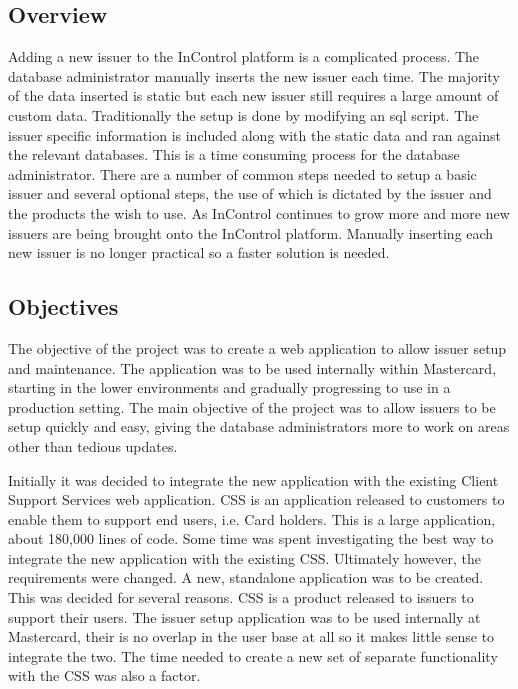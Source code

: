 \documentclass[a4paper, 11pt, titlepage]{article}
\begin{document}
\subsection{Overview}
Adding a new issuer to the InControl platform is a complicated process. The database administrator manually inserts the new issuer each time. The majority of the data inserted is static but each new issuer still requires a large amount of custom data. Traditionally the setup is done by modifying an sql script. The issuer specific information is included along with the static data and ran against the relevant databases. This is a time consuming process for the database administrator. There are a number of common steps needed to setup a basic issuer and several optional steps, the use of which is dictated by the issuer and the products the wish to use. As InControl continues to grow more and more new issuers are being brought onto the InControl platform. Manually inserting each new issuer is no longer practical so a faster solution is needed.

 

\subsection{Objectives}

The objective of the project was to create a web application to allow issuer setup and maintenance. The application was to be used internally within Mastercard, starting in the lower environments and gradually progressing to use in a production setting. The main objective of the project was to allow issuers to be setup quickly and easy, giving the database administrators more to work on areas other than tedious updates.

Initially it was decided to integrate the new application with the existing Client Support Services web application. CSS is an application released to customers to enable them to support end users, i.e. Card holders. This is a large application, about 180,000 lines of code. Some time was spent investigating the best way to integrate the new application with the existing CSS. Ultimately however, the requirements were changed. A new, standalone application was to be created. This was decided for several reasons. CSS is a product released to issuers to support their users. The issuer setup application was to be used internally at Mastercard, their is no overlap in the user base at all so it makes little sense to integrate the two. The time needed to create a new set of separate functionality with the CSS was also a factor.
\end{document}
